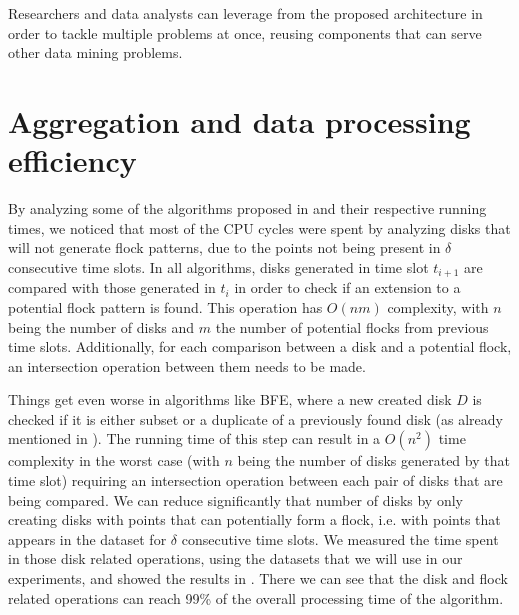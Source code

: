 Researchers and data analysts can leverage from the proposed architecture in order to tackle multiple problems at once,
reusing components that can serve other data mining problems.

\section{Aggregation and data processing efficiency}
\label{sec:bitdf}
By analyzing some of the algorithms proposed in  and their respective running times, we noticed
that most of the CPU cycles were spent by analyzing disks that will not generate flock patterns, due to the points not
being present in $\delta$ consecutive time slots. In all algorithms, disks generated in time slot $t_{i+1}$ are compared
with those generated in $t_{i}$ in order to check if an extension to a potential flock pattern is found. This operation
has $O(nm)$ complexity, with $n$ being the number of disks and $m$ the number of potential flocks from previous time
slots.  Additionally, for each comparison between a disk and a potential flock, an intersection operation between them
needs to be made.

Things get even worse in algorithms like BFE, where a new created disk $D$ is checked if it is either subset or a
duplicate of a previously found disk (as already mentioned in ). The running time of this
step can result in a $O(n^2)$ time complexity in the worst case (with $n$ being the number of disks generated by that
time slot) requiring an intersection operation between each pair of disks that are being compared. We can reduce
significantly that number of disks by only creating disks with points that can potentially form a flock, i.e. with
points that appears in the dataset for $\delta$ consecutive time slots. We measured the time spent in those disk related
operations, using the datasets that we will use in our experiments, and showed the results in
. There we can see that the disk and flock related operations can reach 99\% of the overall
processing time of the algorithm.

